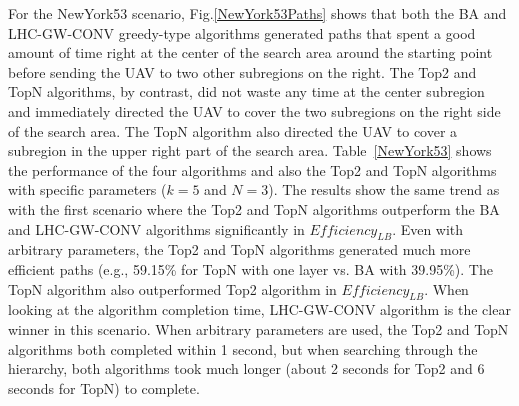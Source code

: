 For the NewYork53 scenario, Fig.\ref{NewYork53Paths} shows that both the BA and LHC-GW-CONV greedy-type algorithms generated paths that spent a good amount of time right at the center of the search area around the starting point before sending the UAV to two other subregions on the right. The Top2 and TopN algorithms, by contrast, did not waste any time at the center subregion and immediately directed the UAV to cover the two subregions on the right side of the search area. The TopN algorithm also directed the UAV to cover a subregion in the upper right part of the search area. Table~\ref{NewYork53} shows the performance of the four algorithms and also the Top2 and TopN algorithms with specific parameters ($k=5$ and $N=3$). The results show the same trend as with the first scenario where the Top2 and TopN algorithms outperform the BA and LHC-GW-CONV algorithms significantly in $\mathit{Efficiency_{LB}}$. Even with arbitrary parameters, the Top2 and TopN algorithms generated much more efficient paths (e.g., 59.15\% for TopN with one layer vs. BA with 39.95\%). The TopN algorithm also outperformed Top2 algorithm in $\mathit{Efficiency_{LB}}$. When looking at the algorithm completion time, LHC-GW-CONV algorithm is the clear winner in this scenario. When arbitrary parameters are used, the Top2 and TopN algorithms both completed within 1 second, but when searching through the hierarchy, both algorithms took much longer (about 2 seconds for Top2 and 6 seconds for TopN) to complete.


